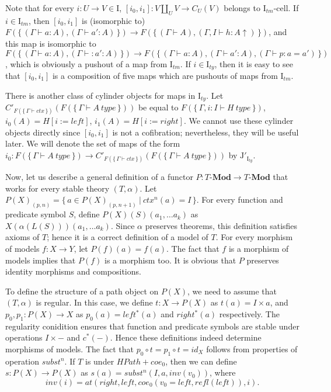 \documentclass[reqno]{amsart}
\theoremstyle{definition}
\theoremstyle{remark}
\newcommand{\repl}{:=}
\newcommand{\cat}[1]{\mathbf{#1}}
\newcommand{\Mod}[1]{#1\text{-}\cat{Mod}}
\newcommand{\I}{\mathrm{I}}
\newcommand{\J}{\mathrm{J}}
\newcommand{\class}[2]{#1\text{-}\mathrm{#2}}
\newcommand{\Icell}[1][\I]{\class{#1}{cell}}
\newcommand{\cyli}{i}
\numberwithin{figure}{section}
\begin{document}
Note that for every $i : U \to V \in \I$, $[\cyli_0,\cyli_1] : V \amalg_U V \to C_U(V)$ belongs to $\Icell[\I_{tm}]$.
If $i \in \I_{tm}$, then $[\cyli_0,\cyli_1]$ is (isomorphic to) $F(\{\,(\Gamma \vdash a : A), (\Gamma \vdash a' : A)\,\}) \to F(\{\,(\Gamma \vdash A), (\Gamma, I \vdash h : A\!\uparrow)\,\})$,
and this map is isomorphic to $F(\{\,(\Gamma \vdash a : A), (\Gamma \vdash : a' : A)\,\}) \to F(\{\,(\Gamma \vdash a : A), (\Gamma \vdash a' : A), (\Gamma \vdash p : a = a')\,\})$,
which is obviously a pushout of a map from $\I_{tm}$.
If $i \in \I_{ty}$, then it is easy to see that $[\cyli_0,\cyli_1]$ is a composition of five maps which are pushouts of maps from $\I_{tm}$.

There is another class of cylinder objects for maps in $\I_{ty}$.
Let $C'_{F(\{\,\Gamma \vdash ctx\,\})}(F(\{\,\Gamma \vdash A\ type\,\}))$ be equal to $F(\{\,\Gamma, i : I \vdash H\ type\,\})$, $\cyli_0(A) = H[i \repl left]$, $\cyli_1(A) = H[i \repl right]$.
We cannot use these cylinder objects directly since $[\cyli_0,\cyli_1]$ is not a cofibration; nevertheless, they will be useful later.
We will denote the set of maps of the form $\cyli_0 : F(\{\,\Gamma \vdash A\ type\,\}) \to C'_{F(\{\,\Gamma \vdash ctx\,\})}(F(\{\,\Gamma \vdash A\ type\,\}))$ by $\J'_{\I_{ty}}$.

Now, let us describe a general definition of a functor $P : \Mod{T} \to \Mod{T}$ that works for every stable theory $(T,\alpha)$.
Let $P(X)_{(p,n)} = \{\,a \in P(X)_{(p,n+1)}\ |\ ctx^n(a) = I\,\}$.
For every function and predicate symbol $S$, define $P(X)(S)(a_1, \ldots a_k)$ as $X(\alpha(L(S)))(a_1, \ldots a_k)$.
Since $\alpha$ preserves theorems, this definition satisfies axioms of $T$; hence it is a correct definition of a model of $T$.
For every morphism of models $f : X \to Y$, let $P(f)(a) = f(a)$.
The fact that $f$ is a morphism of models implies that $P(f)$ is a morphism too.
It is obvious that $P$ preserves identity morphisms and compositions.

To define the structure of a path object on $P(X)$, we need to assume that $(T,\alpha)$ is regular.
In this case, we define $t : X \to P(X)$ as $t(a) = I \times a$, and $p_0,p_1 : P(X) \to X$ as $p_0(a) = left^*(a)$ and $right^*(a)$ respectively.
The regularity conidition ensures that function and predicate symbols are stable under operations $I \times -$ and $c^*(-)$.
Hence these definitions indeed determine morphisms of models.
The fact that $p_0 \circ t = p_1 \circ t = id_X$ follows from properties of operation $subst^n$.
If $T$ is under $HPath + coe_0$, then we can define $s : P(X) \to P(X)$ as $s(a) = subst^n(I, a, inv(v_0))$, where
\[ inv(i) = at(right, left, coe_0(v_0 = left, refl(left)), i). \]
\end{document}
